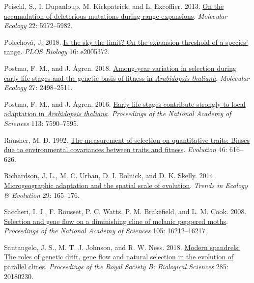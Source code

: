 \documentclass[
  12pt,
]{article}
\newlength{\cslhangindent}
\newlength{\cslentryspacingunit} %
\newenvironment{CSLReferences}[2] %
 {%
  \setlength{\parindent}{0pt}
  \ifodd #1
  \let\oldpar\par
  \def\par{\hangindent=\cslhangindent\oldpar}
  \fi
  \setlength{\parskip}{#2\cslentryspacingunit}
 }%
 {}
\begin{document}
\begin{CSLReferences}{1}{0}
\leavevmode{}%
Peischl, S., I. Dupanloup, M. Kirkpatrick, and L. Excoffier. 2013. \href{https://doi.org/10.1111/mec.12524}{On the accumulation of deleterious mutations during range expansions}. \emph{Molecular Ecology} 22: 5972--5982.

\leavevmode{}%
Polechová, J. 2018. \href{https://doi.org/10.1371/journal.pbio.2005372}{Is the sky the limit? {On} the expansion threshold of a species' range}. \emph{PLOS Biology} 16: e2005372.

\leavevmode{}%
Postma, F. M., and J. Ågren. 2018. \href{https://doi.org/10.1111/mec.14697}{Among-year variation in selection during early life stages and the genetic basis of fitness in \emph{{Arabidopsis} thaliana}}. \emph{Molecular Ecology} 27: 2498--2511.

\leavevmode{}%
Postma, F. M., and J. Ågren. 2016. \href{https://doi.org/10.1073/pnas.1606303113}{Early life stages contribute strongly to local adaptation in \emph{{Arabidopsis} thaliana}}. \emph{Proceedings of the National Academy of Sciences} 113: 7590--7595.

\leavevmode{}%
Rausher, M. D. 1992. \href{https://doi.org/10.1111/j.1558-5646.1992.tb02070.x}{The measurement of selection on quantitative traits: Biases due to environmental covariances between traits and fitness}. \emph{Evolution} 46: 616--626.

\leavevmode{}%
Richardson, J. L., M. C. Urban, D. I. Bolnick, and D. K. Skelly. 2014. \href{https://doi.org/10.1016/j.tree.2014.01.002}{Microgeographic adaptation and the spatial scale of evolution}. \emph{Trends in Ecology \& Evolution} 29: 165--176.

\leavevmode{}%
Saccheri, I. J., F. Rousset, P. C. Watts, P. M. Brakefield, and L. M. Cook. 2008. \href{https://doi.org/10.1073/pnas.0803785105}{Selection and gene flow on a diminishing cline of melanic peppered moths}. \emph{Proceedings of the National Academy of Sciences} 105: 16212--16217.

\leavevmode{}%
Santangelo, J. S., M. T. J. Johnson, and R. W. Ness. 2018. \href{https://doi.org/10.1098/rspb.2018.0230}{Modern spandrels: The roles of genetic drift, gene flow and natural selection in the evolution of parallel clines}. \emph{Proceedings of the Royal Society B: Biological Sciences} 285: 20180230.


\end{CSLReferences}
\end{document}
